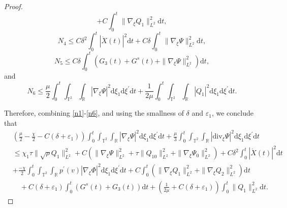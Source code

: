 \documentclass[10pt,reqno]{amsart}
\numberwithin{equation}{section}
\newcommand{\dif}{\mathrm{d}}
\newcommand{\ddiv}{\mathrm{div}}
\begin{document}
\begin{proof}
\begin{equation}
+C\int_0^t\|\nabla_\xi Q_1\|_{L^2}^2\dif t,
\end{equation}
\begin{equation}\label{n4}
N_4\le C\delta^2\int_0^t|\dot X(t)|^2\dif t+C\delta\int_0^t\|\nabla_\xi \Psi\|_{L^2}^2\dif t,
\end{equation}
\begin{equation}\label{n5}
N_5\le C\delta\int_0^t\left(G_3(t)+G^s(t)+\|\nabla_\xi \Psi\|_{L^2}^2\right)\dif t,
\end{equation}
and
\begin{equation}\label{n6}
N_6\le\frac{\mu}{2}
\int_0^t\int_{\mathbb{T}^2}\int_{\mathbb{R}}|\nabla_\xi\Psi|^2\dif \xi_1\dif \xi^{\prime}\dif t
+\frac{1}{2\mu}
\int_0^t\int_{\mathbb{T}^2}\int_{\mathbb{R}}|Q_1|^2\dif \xi_1\dif \xi^{\prime}\dif t.
\end{equation}


Therefore, combining \eqref{n1}-\eqref{n6}, and using the smallness of $\delta$ and $\varepsilon_1$, we conclude that
\begin{equation}\label{hsu1}
\begin{aligned}
&(\frac{\mu}{2}-\frac{\chi}{2}-C(\delta+\varepsilon_1))\int_0^t\int_{\mathbb{T}^2}\int_{\mathbb{R}}|\nabla_\xi\Psi|^2\dif \xi_1\dif \xi^{\prime}\dif t
+\frac{\mu}{3}\int_0^t\int_{\mathbb{T}^2}\int_{\mathbb{R}}
   |\ddiv_\xi\Psi|^2
\dif \xi_1\dif \xi^{\prime}\dif t\\
&\le
\chi_1\tau\|\sqrt\rho Q_{1}\|_{L^2}^2
+C(\|\nabla_\xi\Psi\|_{L^2}^2+\tau\|Q_{10}\|_{L^2}^2+\|\nabla_\xi\Psi_0\|_{L^2}^2)
+C\delta^2\int_0^t|\dot X(t)|^2\dif t\\
&
+\frac{-\chi}{2}\int_0^t\int_{\mathbb{T}^2}\int_{\mathbb{R}}p^\prime(v)|\nabla_\xi\Phi|^2\dif \xi_1\dif \xi^{\prime}\dif t
+C\int_0^t\left(
\|\nabla_\xi Q_1\|_{L^2}^2+\|\nabla_\xi Q_2\|_{L^2}^2\right)\dif t\\
&\quad+C(\delta+\varepsilon_1)\int_0^t\left(G^s(t)+G_3(t)\right)\dif t
+\left(\frac{1}{2\mu}+C(\delta+\varepsilon_1)\right)\int_0^t\|Q_1\|_{L^2}^2\dif t.
\end{aligned}
\end{equation}


\end{proof}
\end{document}

